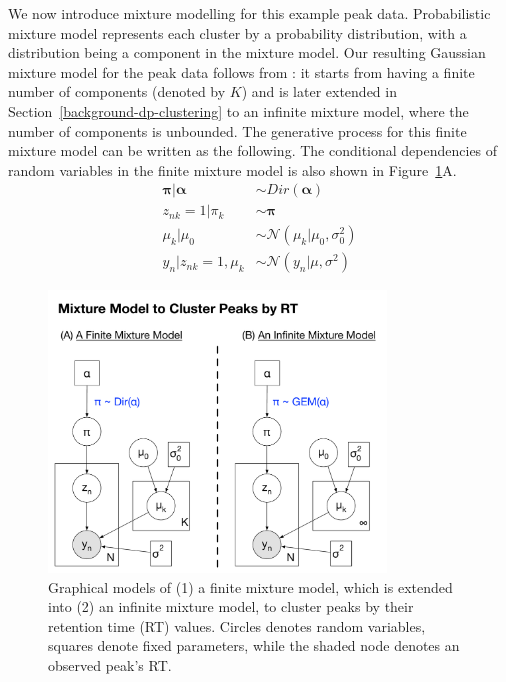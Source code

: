 We now introduce mixture modelling for this example peak data. Probabilistic mixture model represents each cluster by a probability distribution, with a distribution being a component in the mixture model. Our resulting Gaussian mixture model for the peak data follows from \cite{Rasmussen2000}: it starts from having a finite number of components (denoted by $K$) and is later extended in Section~\ref{background-dp-clustering} to an infinite mixture model, where the number of components is unbounded. The generative process for this finite mixture model can be written as the following. The conditional dependencies of random variables in the finite mixture model is also shown in Figure~\ref{fig:background-mixture-plate-diagram}A. 
\begin{equation}
\begin{aligned}
\boldsymbol{\pi} \vert \boldsymbol{\alpha} &\sim Dir(\boldsymbol{\alpha}) \\
z_{nk}=1 \vert \pi_k                                  &\sim \boldsymbol{\pi} \\
\mu_k \vert \mu_0                                    &\sim \mathcal{N}(\mu_k \vert \mu_0, \sigma_0^2) \\
y_n \vert z_{nk}=1, \mu_k                         &\sim \mathcal{N}(y_n \vert \mu, \sigma^2)
\end{aligned}
\label{eq:background-finite-mixture}
\end{equation}

\begin{figure}[tbh!]
\noindent \begin{centering}
\includegraphics[width=0.8\textwidth]{03-machine-learning/figures/mixture_model.pdf}
\par\end{centering}
\caption[Graphical models of (1) a finite mixture model, which is extended into (2) an infinite mixture model, to cluster peaks by their retention time (RT) values.]{\label{fig:background-mixture-plate-diagram}Graphical models of (1) a finite mixture model, which is extended into (2) an infinite mixture model, to cluster peaks by their retention time (RT) values. Circles denotes random variables, squares denote fixed parameters, while the shaded node denotes an observed peak's RT.}
\end{figure}

